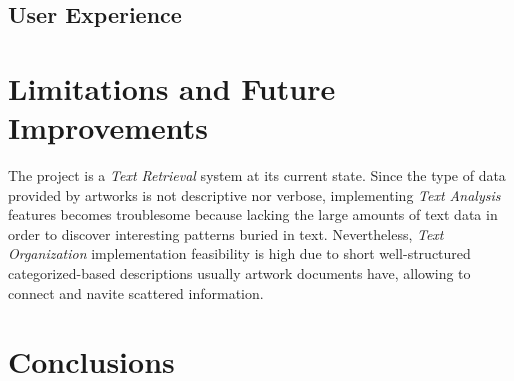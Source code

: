 \documentclass[12pt]{spieman}  %
\begin{document}
\begin{spacing}{1}
    \subsection{User Experience}\label{sec:ux}

    \section{Limitations and Future Improvements}

    The project is a \textit{Text Retrieval} system at its current state.
    Since the type of data provided by artworks is not descriptive nor verbose,
    implementing \textit{Text Analysis} features becomes troublesome because lacking the large amounts of
    text data in order to discover interesting patterns buried in text.
    Nevertheless, \textit{Text Organization} implementation feasibility is high due to
    short well-structured categorized-based descriptions usually artwork documents have,
    allowing to connect and navite scattered information.

    \section{Conclusions}

\end{spacing}
\end{document}
